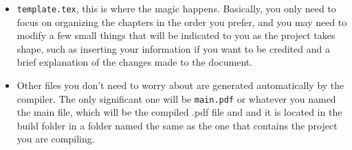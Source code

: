 \begin{itemize}
\begin{itemize}
	\end{itemize}
	\item \texttt{template.tex}, this is where the magic happens. Basically, you only need to focus on organizing the chapters in the order you prefer, and you may need to modify a few small things that will be indicated to you as the project takes shape, such as inserting your information if you want to be credited and a brief explanation of the changes made to the document.
	\item Other files you don’t need to worry about are generated automatically by the compiler. The only significant one will be \texttt{main.pdf} or whatever you named the main file, which will be the compiled .pdf file and and it is located in the build folder in a folder named the same as the one that contains the project you are compiling.
\end{itemize}
